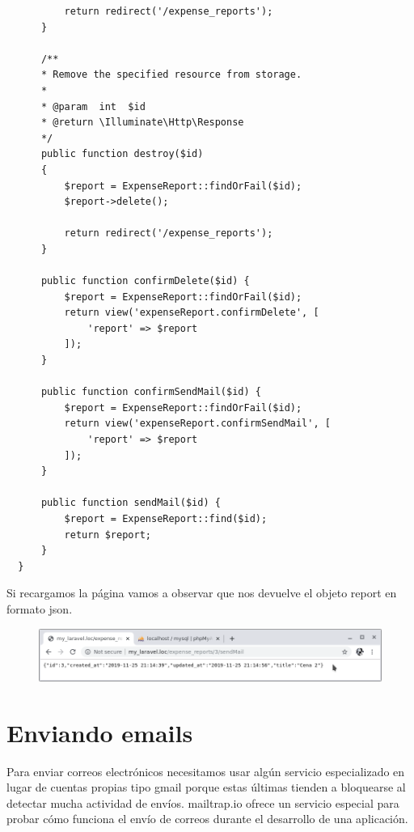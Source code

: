 \documentclass{article}
\begin{document}
\begin{verbatim}
          return redirect('/expense_reports');
      }

      /**
      * Remove the specified resource from storage.
      *
      * @param  int  $id
      * @return \Illuminate\Http\Response
      */
      public function destroy($id)
      {
          $report = ExpenseReport::findOrFail($id);
          $report->delete();

          return redirect('/expense_reports');
      }

      public function confirmDelete($id) {
          $report = ExpenseReport::findOrFail($id);
          return view('expenseReport.confirmDelete', [
              'report' => $report
          ]);
      }

      public function confirmSendMail($id) {
          $report = ExpenseReport::findOrFail($id);
          return view('expenseReport.confirmSendMail', [
              'report' => $report
          ]);
      }

      public function sendMail($id) {
          $report = ExpenseReport::find($id);
          return $report;
      }
  }
\end{verbatim}

Si recargamos la página vamos a observar que nos devuelve el objeto report en
formato json.

\begin{figure}[h!]
  \centering
  \includegraphics[scale=0.5]{./Pictures/123_report_json.png}
\end{figure}

\newpage


\section{Enviando emails}%
Para enviar correos electrónicos necesitamos usar algún servicio especializado
en lugar de cuentas propias tipo gmail porque estas últimas tienden a
bloquearse al detectar mucha actividad de envíos. mailtrap.io ofrece un
servicio especial para probar cómo funciona el envío de correos durante el
desarrollo de una aplicación.\\
\end{document}

